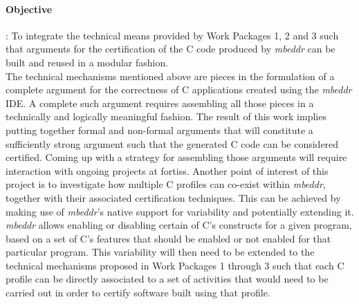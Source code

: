 \paragraph{\textbf{Objective}}: To integrate the technical means provided by
Work Packages 1, 2 and 3 such that arguments for the certification of the C code
produced by \emph{mbeddr} can be built and reused in a modular
fashion.\vspace{.2cm}\\
The technical mechanisms mentioned above are pieces in the formulation of a
complete argument for the correctness of C applications created using the
\emph{mbeddr} IDE.
A complete such argument requires assembling all those pieces in a technically and logically meaningful fashion. The result of
this work implies putting together formal and non-formal arguments that will
constitute a sufficiently strong argument such that the generated C code can be
considered certified.
Coming up with a strategy for assembling those arguments will require
interaction with ongoing projects at fortiss. Another point of interest of
this project is to investigate how multiple C profiles can co-exist within
\emph{mbeddr}, together with their associated certification techniques. This can
be achieved by making use of \emph{mbeddr}'s native support for variability and
potentially extending it. \emph{mbeddr} allows enabling or disabling certain of
C's constructs for a given program, based on a set of C's features that should
be enabled or not enabled for that particular program.
This variability will then need to be extended to the technical mechanisms
proposed in Work Packages 1 through 3 such that each C profile can be directly
associated to a set of activities that would need to be carried out in order to
certify software built using that profile.

